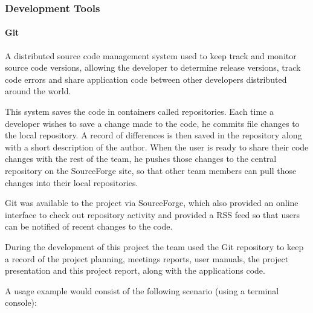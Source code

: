 \subsubsection{Development Tools}

\paragraph{Git}

A distributed source code management system used to keep track and monitor
source code versions, allowing the developer to determine release versions,
track code errors and share application code between other developers
distributed around the world.

This system saves the code in containers called repositories. Each time a
developer wishes to save a change made to the code, he commits file changes to
the local repository. A record of differences is then saved in the repository
along with a short description of the author. When the user is ready to share
their code changes with the rest of the team, he pushes those changes to the
central repository on the SourceForge site, so that other team members can pull
those changes into their local repositories.

Git was available to the project via SourceForge, which also provided an online
interface to check out repository activity and provided a RSS feed so that users
can be notified of recent changes to the code.

During the development of this project the team used the Git repository to keep
a record of the project planning, meetings reports, user manuals, the project
presentation and this project report, along with the applications code.

A usage example would consist of the following scenario (using a terminal
console):

